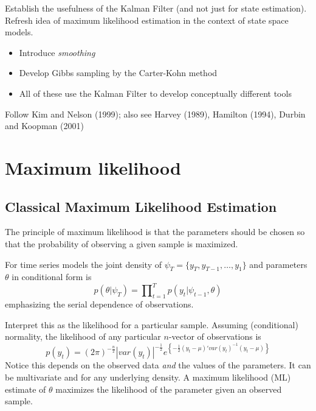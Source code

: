\documentclass[
  letterpaper,
]{book}
\providecommand{\tightlist}{%
  \setlength{\itemsep}{0pt}\setlength{\parskip}{0pt}}\usepackage{longtable,booktabs,array}
\begin{document}
Establish the usefulness of the Kalman Filter (and not just for state
estimation). Refresh idea of maximum likelihood estimation in the
context of state space models.

\begin{itemize}
\tightlist
\item
  Introduce \emph{smoothing}
\item
  Develop Gibbs sampling by the Carter-Kohn method
\item
  All of these use the Kalman Filter to develop conceptually different
  tools
\end{itemize}

Follow Kim and Nelson (1999); also see Harvey (1989), Hamilton (1994),
Durbin and Koopman (2001)

\hypertarget{maximum-likelihood}{%
\section{Maximum likelihood}\label{maximum-likelihood}}

\hypertarget{classical-maximum-likelihood-estimation}{%
\subsection{Classical Maximum Likelihood
Estimation}\label{classical-maximum-likelihood-estimation}}

The principle of maximum likelihood is that the parameters should be
chosen so that the probability of observing a given sample is maximized.

For time series models the joint density of
\(\psi_T = \{y_T, y_{T-1},\ldots ,y_1 \}\) and parameters \(\theta\) in
conditional form is \begin{equation}
 p(\theta|\psi_T) = \prod\nolimits_{t=1}^T p (y_t|\psi_{t-1},\theta)
\end{equation} emphasizing the serial dependence of observations.

Interpret this as the likelihood for a particular sample. Assuming
(conditional) normality, the likelihood of any particular \(n\)-vector
of observations is \begin{equation}
p(y_t) = (2\pi)^{-\frac{n}{2}}|var(y_t)|^{-\frac{1}{2}}e^{\left\{ -\frac{1}{2}(y_t-\mu )' var(y_t)^{-1}(y_t-\mu)\right\} }
\end{equation} Notice this depends on the observed data \emph{and} the
values of the parameters. It can be multivariate and for any underlying
density. A maximum likelihood (ML) estimate of \(\theta\) maximizes the
likelihood of the parameter given an observed sample.
\end{document}
